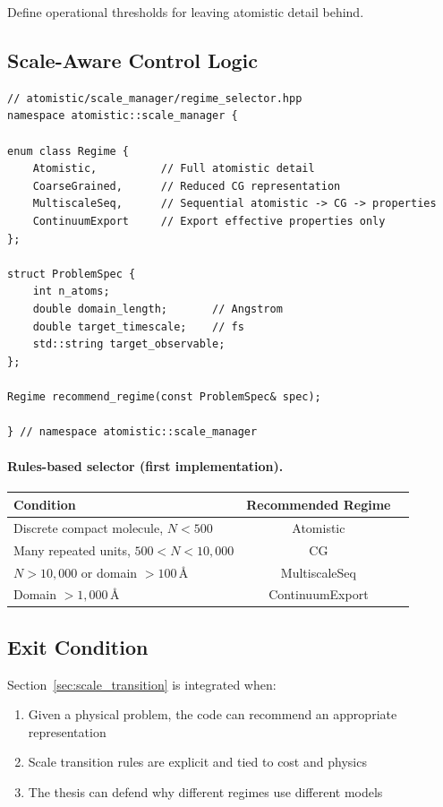 \documentclass[11pt]{article}
\begin{document}
Define operational thresholds for leaving atomistic detail behind.

\subsection{Scale-Aware Control Logic}

\begin{lstlisting}
// atomistic/scale_manager/regime_selector.hpp
namespace atomistic::scale_manager {

enum class Regime {
    Atomistic,          // Full atomistic detail
    CoarseGrained,      // Reduced CG representation
    MultiscaleSeq,      // Sequential atomistic -> CG -> properties
    ContinuumExport     // Export effective properties only
};

struct ProblemSpec {
    int n_atoms;
    double domain_length;       // Angstrom
    double target_timescale;    // fs
    std::string target_observable;
};

Regime recommend_regime(const ProblemSpec& spec);

} // namespace atomistic::scale_manager
\end{lstlisting}

\paragraph{Rules-based selector (first implementation).}

\begin{center}
\begin{tabular}{lcl}
\toprule
\textbf{Condition} & \textbf{Recommended Regime} \\
\midrule
Discrete compact molecule, $N < 500$ & Atomistic \\
Many repeated units, $500 < N < 10{,}000$ & CG \\
$N > 10{,}000$ or domain $> 100$\,\AA & MultiscaleSeq \\
Domain $> 1{,}000$\,\AA & ContinuumExport \\
\bottomrule
\end{tabular}
\end{center}

\subsection{Exit Condition}

Section~\ref{sec:scale_transition} is integrated when:
\begin{enumerate}
  \item Given a physical problem, the code can recommend an appropriate
        representation
  \item Scale transition rules are explicit and tied to cost and physics
  \item The thesis can defend why different regimes use different models
\end{enumerate}
\end{document}
